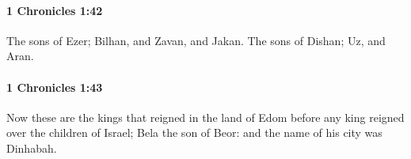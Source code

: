 		\paragraph{1 Chronicles 1:42} %
			\label{1CHRONICLES-1-42}

			The sons of Ezer; Bilhan, and Zavan, and Jakan. The sons of Dishan; Uz, and Aran.


		\paragraph{1 Chronicles 1:43} %
			\label{1CHRONICLES-1-43}

			Now these are the kings that reigned in the land of Edom before any king reigned over the children of Israel; Bela the son of Beor: and the name of his city was Dinhabah.


